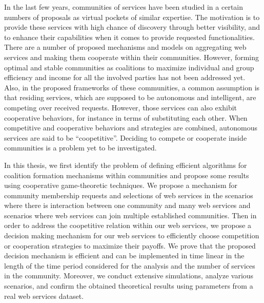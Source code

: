 
In the last few years, communities of services have been studied in a certain numbers of proposals as virtual pockets of similar expertise. The motivation is to provide these services with high chance of discovery through better visibility, and to enhance their capabilities when it comes to provide requested functionalities. There are a number of proposed mechanisms and models on aggregating web services and making them cooperate within their communities. However, forming optimal and stable communities as coalitions to maximize individual and group efficiency and income for all the involved parties has not been addressed yet. Also, in the proposed frameworks of these communities, a common assumption is that residing services, which are supposed to be autonomous and intelligent, are competing over received requests. However, those services can also exhibit cooperative behaviors, for instance in terms of substituting each other. When competitive and cooperative behaviors and strategies are combined, autonomous services are said to be ``coopetitive''. Deciding to compete or cooperate inside communities is a problem yet to be investigated.

In this thesis, we first identify the problem of defining efficient algorithms for coalition formation mechanisms within communities and propose some results using cooperative game-theoretic techniques. We propose a mechanism for community membership requests and selections of web services in the scenarios where there is interaction between one community and many web services and scenarios where web services can join multiple established communities. Then in order to address the coopetitive relation within our web services, we propose a decision making mechanism for our web services to efficiently choose competition or cooperation strategies to maximize their payoffs. We prove that the proposed decision mechanism is
efficient and can be implemented in time linear in the length of the time period considered for the analysis and the number of services in the community. Moreover, we conduct extensive
simulations, analyze various scenarios, and confirm the obtained theoretical results using parameters from a real web services dataset.


